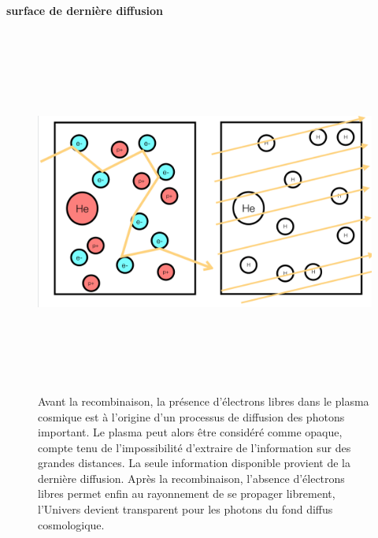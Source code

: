 \paragraph{surface de dernière diffusion}

\begin{figure}[htbp]
	\centering
		\includegraphics[height=12cm]{figs/diffusion.png}
	\caption[Le plasma cosmique avant la recombinaison]{Avant la recombinaison, la présence d'électrons libres dans le plasma cosmique est à l'origine d'un processus de diffusion des photons important. Le plasma peut alors être considéré comme opaque, compte tenu de l'impossibilité d'extraire de l'information sur des grandes distances. La seule information disponible provient de la dernière diffusion. Après la recombinaison, l'absence d'électrons libres permet enfin au rayonnement de se propager librement, l'Univers devient transparent pour les photons du fond diffus cosmologique.}
	\label{f:diffusion}
\end{figure}

